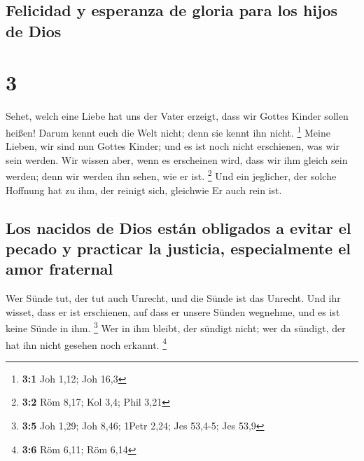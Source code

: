 \hypertarget{felicidad-y-esperanza-de-gloria-para-los-hijos-de-dios}{%
\subsection{Felicidad y esperanza de gloria para los hijos de
Dios}\label{felicidad-y-esperanza-de-gloria-para-los-hijos-de-dios}}

\hypertarget{section-2}{%
\section{3}\label{section-2}}

 Sehet, welch eine Liebe hat uns der Vater erzeigt, dass
wir Gottes Kinder sollen heißen! Darum kennt euch die Welt nicht; denn
sie kennt ihn nicht. \footnote{\textbf{3:1} Joh 1,12; Joh 16,3}
 Meine Lieben, wir sind nun Gottes Kinder; und es ist noch
nicht erschienen, was wir sein werden. Wir wissen aber, wenn es
erscheinen wird, dass wir ihm gleich sein werden; denn wir werden ihn
sehen, wie er ist. \footnote{\textbf{3:2} Röm 8,17; Kol 3,4; Phil 3,21}
 Und ein jeglicher, der solche Hoffnung hat zu ihm, der
reinigt sich, gleichwie Er auch rein ist.

\hypertarget{los-nacidos-de-dios-estuxe1n-obligados-a-evitar-el-pecado-y-practicar-la-justicia-especialmente-el-amor-fraternal}{%
\subsection{Los nacidos de Dios están obligados a evitar el pecado y
practicar la justicia, especialmente el amor
fraternal}\label{los-nacidos-de-dios-estuxe1n-obligados-a-evitar-el-pecado-y-practicar-la-justicia-especialmente-el-amor-fraternal}}

 Wer Sünde tut, der tut auch Unrecht, und die Sünde ist
das Unrecht.  Und ihr wisset, dass er ist erschienen, auf
dass er unsere Sünden wegnehme, und es ist keine Sünde in ihm.
\footnote{\textbf{3:5} Joh 1,29; Joh 8,46; 1Petr 2,24; Jes 53,4-5; Jes
  53,9}  Wer in ihm bleibt, der sündigt nicht; wer da
sündigt, der hat ihn nicht gesehen noch erkannt. \footnote{\textbf{3:6}
  Röm 6,11; Röm 6,14}

